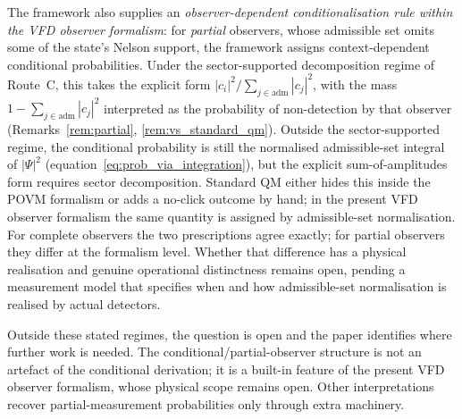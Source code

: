 \documentclass[12pt]{article}
\begin{document}
The framework also supplies an \emph{observer-dependent conditionalisation rule within the VFD observer formalism}: for \emph{partial} observers, whose admissible set omits some of the state's Nelson support, the framework assigns context-dependent conditional probabilities. Under the sector-supported decomposition regime of Route~C, this takes the explicit form $|c_i|^2 / \sum_{j \in \mathrm{adm}}|c_j|^2$, with the mass $1 - \sum_{j \in \mathrm{adm}}|c_j|^2$ interpreted as the probability of non-detection by that observer (Remarks~\ref{rem:partial}, \ref{rem:vs_standard_qm}). Outside the sector-supported regime, the conditional probability is still the normalised admissible-set integral of $|\Psi|^2$ (equation~\eqref{eq:prob_via_integration}), but the explicit sum-of-amplitudes form requires sector decomposition. Standard QM either hides this inside the POVM formalism or adds a no-click outcome by hand; in the present VFD observer formalism the same quantity is assigned by admissible-set normalisation. For complete observers the two prescriptions agree exactly; for partial observers they differ at the formalism level. Whether that difference has a physical realisation and genuine operational distinctness remains open, pending a measurement model that specifies when and how admissible-set normalisation is realised by actual detectors.

Outside these stated regimes, the question is open and the paper identifies where further work is needed. The conditional/partial-observer structure is not an artefact of the conditional derivation; it is a built-in feature of the present VFD observer formalism, whose physical scope remains open. Other interpretations recover partial-measurement probabilities only through extra machinery.



\end{document}
